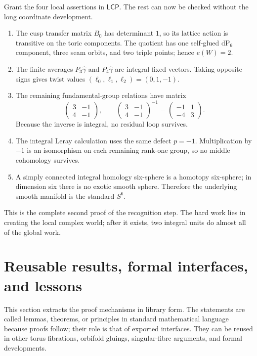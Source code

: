 \documentclass[11pt,reqno]{amsart}
\numberwithin{equation}{section}
\newcommand{\dP}{\mathrm{dP}_6}
\newcommand{\wideg}{\widehat\gamma}
\newcommand{\LCP}{\mathsf{LCP}}
\theoremstyle{definition}
\begin{document}
Grant the four local assertions in $\LCP$. The rest can now be checked without the long coordinate development.
\begin{enumerate}
\item The cusp transfer matrix $B_0$ has determinant $1$, so its lattice action is transitive on the toric components. The quotient has one self-glued $\dP$ component, three seam orbits, and two triple points; hence $e(W)=2$.
\item The finite averages $P_3\wideg$ and $P_4\wideg$ are integral fixed vectors. Taking opposite signs gives twist values $(\ell_0,\ell_1,\ell_2)=(0,1,-1)$.
\item The remaining fundamental-group relations have matrix
\[
\begin{pmatrix}3&-1\\4&-1\end{pmatrix},
\qquad
\begin{pmatrix}3&-1\\4&-1\end{pmatrix}^{-1}
=
\begin{pmatrix}-1&1\\-4&3\end{pmatrix}.
\]
Because the inverse is integral, no residual loop survives.
\item The integral Leray calculation uses the same defect $p=-1$. Multiplication by $-1$ is an isomorphism on each remaining rank-one group, so no middle cohomology survives.
\item A simply connected integral homology six-sphere is a homotopy six-sphere; in dimension six there is no exotic smooth sphere. Therefore the underlying smooth manifold is the standard $S^6$.
\end{enumerate}
This is the complete second proof of the recognition step. The hard work lies in creating the local complex world; after it exists, two integral units do almost all of the global work.

\section{Reusable results, formal interfaces, and lessons}\label{sec:lemmas}

This section extracts the proof mechanisms in library form. The statements are called lemmas, theorems, or principles in standard mathematical language because proofs follow; their role is that of exported interfaces. They can be reused in other torus fibrations, orbifold gluings, singular-fibre arguments, and formal developments.
\end{document}
